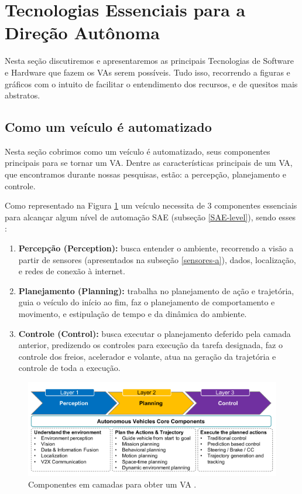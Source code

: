 \section{Tecnologias Essenciais para a Direção Autônoma} \label{essencias_di}

Nesta seção discutiremos e apresentaremos as principais Tecnologias de Software e Hardware que fazem os VAs serem possíveis. Tudo isso, recorrendo a figuras e gráficos com o intuito de facilitar o entendimento dos recursos, e de quesitos mais abstratos. 


\subsection{Como um veículo é automatizado} \label{auto}
Nesta seção cobrimos como um veículo é automatizado, seus componentes principais para se tornar um VA. Dentre as características principais de um VA, que encontramos durante nossas pesquisas, estão: a percepção, planejamento e controle.

Como representado na Figura \ref{figura_perception} um veículo necessita de 3 componentes essenciais para alcançar algum nível de automação SAE (subseção \ref{SAE-level}), sendo esses \cite{sensors-yet}:


\begin{enumerate}
 \item \textbf{Percepção (Perception):} busca entender o ambiente, recorrendo a visão a partir de sensores (apresentados na subseção \ref{sensores-a}), dados, localização, e redes de conexão à internet.
\item \textbf{Planejamento (Planning):} trabalha no planejamento de ação e trajetória, guia o veículo do início ao fim, faz o planejamento de comportamento e movimento, e estipulação de tempo e da dinâmica do ambiente.
\item \textbf{Controle (Control):} busca executar o planejamento deferido pela camada anterior, predizendo os controles para execução da tarefa designada, faz o controle dos freios, acelerador e volante, atua na geração da trajetória e controle de toda a execução.

\end{enumerate}

\begin{figure}[H]
\centering
\includegraphics[width=\textwidth]{Figures/perception.png}
\caption{Componentes em camadas para obter um VA \cite{sensors-yet}.}
\label{figura_perception}
\end{figure}

